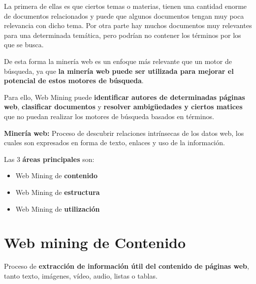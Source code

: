 \documentclass[12pt, twoside, openright]{report} %
\begin{document}
La primera de ellas es que ciertos temas o materias, tienen una cantidad enorme de documentos relacionados y puede que algunos documentos tengan muy poca relevancia con dicho tema. Por otra parte hay muchos documentos muy relevantes para una determinada temática, pero podrían no contener los términos por los que se busca.

De esta forma la minería web es un enfoque más relevante que un motor de búsqueda, ya que \textbf{la minería web puede ser utilizada para mejorar el potencial de estos motores de búsqueda}.

Para ello, Web Mining puede \textbf{identificar autores de determinadas páginas web}, \textbf{clasificar documentos} y \textbf{resolver ambigüedades y ciertos matices} que no puedan realizar los motores de búsqueda basados en términos.

\textbf{Minería web:} Proceso de descubrir relaciones intrínsecas de los datos web, los cuales son expresados en forma de texto, enlaces y uso de la información.

Las 3 \textbf{áreas principales} son:
\begin{itemize}
	\item Web Mining de \textbf{contenido}
	\item Web Mining de \textbf{estructura}
	\item Web Mining de \textbf{utilización}
\end{itemize}

\section{Web mining de Contenido}
Proceso de \textbf{extracción de información útil del contenido de páginas web}, tanto texto, imágenes, vídeo, audio, listas o tablas. 
\end{document}

